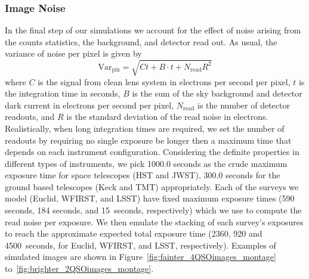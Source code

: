 \documentclass[a4paper,11pt]{article}
\begin{document}
%


\subsubsection{Image Noise}

In the final step of our simulations we account for the effect of
noise arising from the counts statistics, the background, and detector
read out. As usual, the variance of noise per pixel is given by
%
\begin{equation}
   \label{eq:noise}
   \mathrm{Var}_{\mathrm{pix}} = \sqrt{Ct+B\cdot t + N_{\mathrm{read}} R^{2}}
\end{equation}
%
where $C$ is the signal from clean lens system in electrons per second
per pixel, $t$ is the integration time in seconds, $B$
is the sum of the sky background and detector dark current in
electrons per second per pixel, $N_{\mathrm{read}}$ is the number of
detector readouts, and $R$ is the standard deviation of the read noise
in electrons. Realistically, when long integration times are required,
we set the number of readouts by requiring no single exposure be
longer then a maximum time that depends on each instrument
configuration.
Considering the definite properties in different types of instruments,
we pick 1000.0 seconds as the crude maximum exposure time for space
telescopes (HST and JWST), 300.0 seconds for the ground based
telescopes (Keck and TMT) appropriately. Each of the surveys we
model  (Euclid, WFIRST, and LSST) have fixed maximum exposure times
(590 seconds, 184 seconds, and 15~seconds, respectively) which
we use to compute the read noise per exposure. We then emulate  the
stacking of each survey's exposures to reach the approximate expected
total exposure time (2360, 920 and 4500~seconds, for Euclid, WFIRST,
and LSST, respectively).
Examples of simulated images are shown in
Figure~\ref{fig:fainter_4QSOimages_montage}
to~\ref{fig:brighter_2QSOimages_montage}.
\end{document}
